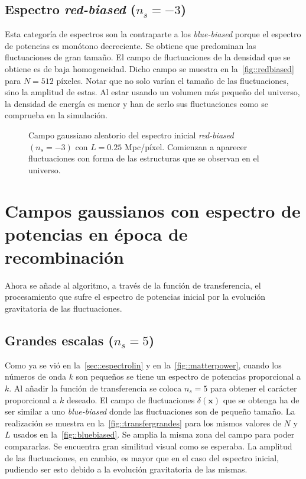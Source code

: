 \subsection{Espectro \textit{red-biased} (\texorpdfstring{\(n_s=-3\)}{ns=-3})}
Esta categoría de espectros son la contraparte a los \textit{blue-biased} porque el espectro de potencias es monótono decreciente. Se obtiene que predominan las fluctuaciones de gran tamaño. El campo de fluctuaciones de la densidad que se obtiene es de baja homogeneidad. Dicho campo se muestra en la~\autoref{fig::redbiased} para \(N=512\) píxeles. Notar que no solo varían el tamaño de las fluctuaciones, sino la amplitud de estas. Al estar usando un volumen más pequeño del universo, la densidad de energía es menor y han de serlo sus fluctuaciones como se comprueba en la simulación.
\begin{figure}[h!]
    \centering
    {}
    \caption[Espectro inicial \textit{red-biased} \(N=512\) píxeles y \(L=0.25\) Mpc/píxel]{Campo gaussiano aleatorio del espectro inicial \textit{red-biased} \((n_s=-3)\) con \(L=0.25\) Mpc/píxel. Comienzan a aparecer fluctuaciones con forma de las estructuras que se observan en el universo.}
    \label{fig::redbiased}
\end{figure}
\clearpage
\section{Campos gaussianos con espectro de potencias en época de recombinación}
Ahora se añade al algoritmo, a través de la función de transferencia, el procesamiento que sufre el espectro de potencias inicial por la evolución gravitatoria de las fluctuaciones.
\subsection{Grandes escalas (\texorpdfstring{\(n_s=5\)}{ns=5})}
Como ya se vió en la~\autoref{sec::espectrolin} y en la~\autoref{fig::matterpower}, cuando los números de onda \(k\) son pequeños se tiene un espectro de potencias proporcional a \(k\). Al añadir la función de transferencia se coloca \(n_s=5\) para obtener el carácter proporcional a \(k\) deseado. El campo de fluctuaciones \(\delta(\symbf{x})\) que se obtenga ha de ser similar a uno \textit{blue-biased} donde las fluctuaciones son de pequeño tamaño. La realización se muestra en la~\autoref{fig::transfergrandes} para los mismos valores de \(N\) y \(L\) usados en la~\autoref{fig::bluebiased}. Se amplia la misma zona del campo para poder compararlas. Se encuentra gran similitud visual como se esperaba. La amplitud de las fluctuaciones, en cambio, es mayor que en el caso del espectro inicial, pudiendo ser esto debido a la evolución gravitatoria de las mismas.

